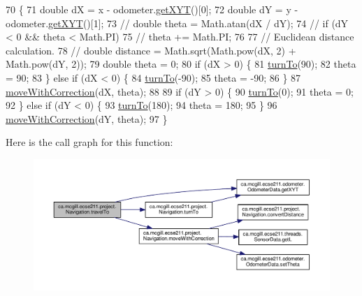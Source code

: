 \begin{DoxyCode}
70                                                           \{
71     \textcolor{keywordtype}{double} dX = x - odometer.\hyperlink{classca_1_1mcgill_1_1ecse211_1_1odometer_1_1_odometer_data_a8f40f0264c68f0cbed4fff1723ae7863}{getXYT}()[0];
72     \textcolor{keywordtype}{double} dY = y - odometer.\hyperlink{classca_1_1mcgill_1_1ecse211_1_1odometer_1_1_odometer_data_a8f40f0264c68f0cbed4fff1723ae7863}{getXYT}()[1];
73     \textcolor{comment}{// double theta = Math.atan(dX / dY);}
74     \textcolor{comment}{// if (dY < 0 && theta < Math.PI)}
75     \textcolor{comment}{// theta += Math.PI;}
76 
77     \textcolor{comment}{// Euclidean distance calculation.}
78     \textcolor{comment}{// double distance = Math.sqrt(Math.pow(dX, 2) + Math.pow(dY, 2));}
79     \textcolor{keywordtype}{double} theta = 0;
80     \textcolor{keywordflow}{if} (dX > 0) \{
81       \hyperlink{classca_1_1mcgill_1_1ecse211_1_1project_1_1_navigation_a3bbe0645f2b3b3d0986b4a707fb5a00c}{turnTo}(90);
82       theta = 90;
83     \} \textcolor{keywordflow}{else} \textcolor{keywordflow}{if} (dX < 0) \{
84       \hyperlink{classca_1_1mcgill_1_1ecse211_1_1project_1_1_navigation_a3bbe0645f2b3b3d0986b4a707fb5a00c}{turnTo}(-90);
85       theta = -90;
86     \}
87     \hyperlink{classca_1_1mcgill_1_1ecse211_1_1project_1_1_navigation_a48eeb9ae2da23664421e8da5642054c7}{moveWithCorrection}(dX, theta);
88 
89     \textcolor{keywordflow}{if} (dY > 0) \{
90       \hyperlink{classca_1_1mcgill_1_1ecse211_1_1project_1_1_navigation_a3bbe0645f2b3b3d0986b4a707fb5a00c}{turnTo}(0);
91       theta = 0;
92     \} \textcolor{keywordflow}{else} \textcolor{keywordflow}{if} (dY < 0) \{
93       \hyperlink{classca_1_1mcgill_1_1ecse211_1_1project_1_1_navigation_a3bbe0645f2b3b3d0986b4a707fb5a00c}{turnTo}(180);
94       theta = 180;
95     \}
96     \hyperlink{classca_1_1mcgill_1_1ecse211_1_1project_1_1_navigation_a48eeb9ae2da23664421e8da5642054c7}{moveWithCorrection}(dY, theta);
97   \}
\end{DoxyCode}
Here is the call graph for this function\+:\nopagebreak
\begin{figure}[H]
\begin{center}
\leavevmode
\includegraphics[width=350pt]{classca_1_1mcgill_1_1ecse211_1_1project_1_1_navigation_ada8a324c1d391698164476d4d728f0c4_cgraph}
\end{center}
\end{figure}
